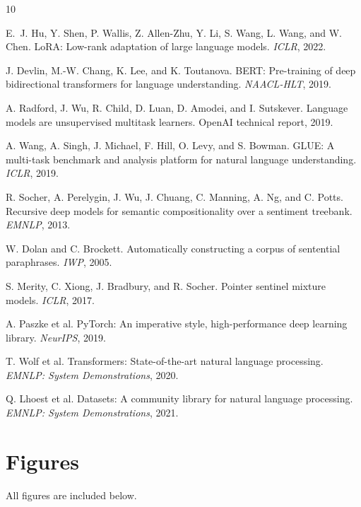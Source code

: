 \documentclass[11pt,twocolumn]{article}
\begin{document}
{
\begin{thebibliography}{10}
\setlength{\itemsep}{-1pt}
\setlength{\parskip}{0pt}

E.~J. Hu, Y. Shen, P. Wallis, Z. Allen-Zhu, Y. Li, S. Wang, L. Wang, and W. Chen. LoRA: Low-rank adaptation of large language models. \emph{ICLR}, 2022.

J. Devlin, M.-W. Chang, K. Lee, and K. Toutanova. BERT: Pre-training of deep bidirectional transformers for language understanding. \emph{NAACL-HLT}, 2019.

A. Radford, J. Wu, R. Child, D. Luan, D. Amodei, and I. Sutskever. Language models are unsupervised multitask learners. OpenAI technical report, 2019.

A. Wang, A. Singh, J. Michael, F. Hill, O. Levy, and S. Bowman. GLUE: A multi-task benchmark and analysis platform for natural language understanding. \emph{ICLR}, 2019.

R. Socher, A. Perelygin, J. Wu, J. Chuang, C. Manning, A. Ng, and C. Potts. Recursive deep models for semantic compositionality over a sentiment treebank. \emph{EMNLP}, 2013.

W. Dolan and C. Brockett. Automatically constructing a corpus of sentential paraphrases. \emph{IWP}, 2005.

S. Merity, C. Xiong, J. Bradbury, and R. Socher. Pointer sentinel mixture models. \emph{ICLR}, 2017.

A. Paszke et al. PyTorch: An imperative style, high-performance deep learning library. \emph{NeurIPS}, 2019.

T. Wolf et al. Transformers: State-of-the-art natural language processing. \emph{EMNLP: System Demonstrations}, 2020.

Q. Lhoest et al. Datasets: A community library for natural language processing. \emph{EMNLP: System Demonstrations}, 2021.

\end{thebibliography}
}

\clearpage
\onecolumn
\section*{Figures}
All figures are included below.
\end{document}

